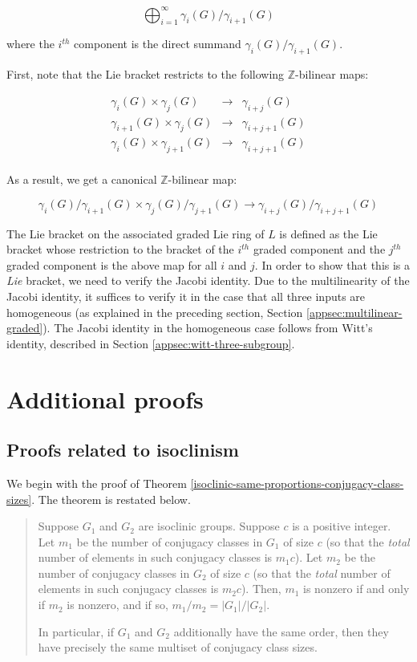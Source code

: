 \documentclass{ucetd}
\begin{document}
$$\bigoplus_{i=1}^\infty \gamma_i(G)/\gamma_{i+1}(G)$$

where the $i^{th}$ component is the direct summand
$\gamma_i(G)/\gamma_{i+1}(G)$.

First, note that the Lie bracket restricts to the following
$\mathbb{Z}$-bilinear maps:

\begin{eqnarray*}
  \gamma_i(G) \times \gamma_j(G) & \to & \gamma_{i+j}(G)\\
  \gamma_{i+1}(G) \times \gamma_j(G) & \to & \gamma_{i+j+1}(G)\\
  \gamma_i(G) \times \gamma_{j+1}(G) & \to & \gamma_{i+j+1}(G)\\
\end{eqnarray*}

As a result, we get a canonical $\mathbb{Z}$-bilinear map:

$$\gamma_i(G)/\gamma_{i+1}(G) \times \gamma_j(G)/\gamma_{j+1}(G) \to \gamma_{i+j}(G)/\gamma_{i+j+1}(G)$$

The Lie bracket on the associated graded Lie ring of $L$ is defined as
the Lie bracket whose restriction to the bracket of the $i^{th}$
graded component and the $j^{th}$ graded component is the above map
for all $i$ and $j$. In order to show that this is a {\em Lie}
bracket, we need to verify the Jacobi identity. Due to the
multilinearity of the Jacobi identity, it suffices to verify it in the
case that all three inputs are homogeneous (as explained in the
preceding section, Section \ref{appsec:multilinear-graded}). The
Jacobi identity in the homogeneous case follows from Witt's identity,
described in Section \ref{appsec:witt-three-subgroup}.

\section{Additional proofs}

\subsection{Proofs related to isoclinism}\label{appsec:isoclinism-extra-proofs}

We begin with the proof of Theorem
\ref{isoclinic-same-proportions-conjugacy-class-sizes}. The theorem is
restated below.

\begin{quote}
  Suppose $G_1$ and $G_2$ are isoclinic groups. Suppose $c$ is a
  positive integer. Let $m_1$ be the number of conjugacy classes in
  $G_1$ of size $c$ (so that the {\em total} number of elements in
  such conjugacy classes is $m_1c$). Let $m_2$ be the number of
  conjugacy classes in $G_2$ of size $c$ (so that the {\em total}
  number of elements in such conjugacy classes is $m_2c$). Then, $m_1$
  is nonzero if and only if $m_2$ is nonzero, and if so, $m_1/m_2 =
  |G_1|/|G_2|$.

  In particular, if $G_1$ and $G_2$ additionally have the same order,
  then they have precisely the same multiset of conjugacy class sizes.

\end{quote}
\end{document}
